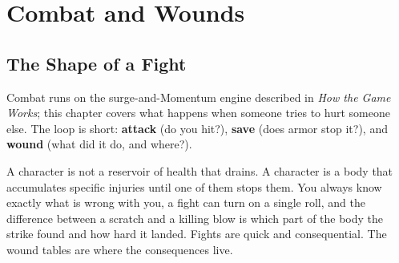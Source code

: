 
\chapter{Combat and Wounds}

\section{The Shape of a Fight}

Combat runs on the surge-and-Momentum engine described in \textit{How the Game Works}; this chapter covers what happens when someone tries to hurt someone else. The loop is short: \textbf{attack} (do you hit?), \textbf{save} (does armor stop it?), and \textbf{wound} (what did it do, and where?).

A character is not a reservoir of health that drains. A character is a body that accumulates specific injuries until one of them stops them. You always know exactly what is wrong with you, a fight can turn on a single roll, and the difference between a scratch and a killing blow is which part of the body the strike found and how hard it landed. Fights are quick and consequential. The wound tables are where the consequences live.

